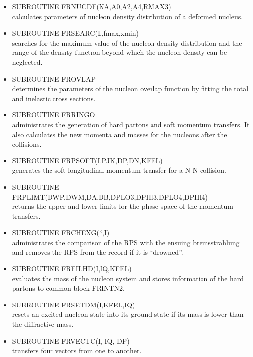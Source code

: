 \begin{itemize}
\item  SUBROUTINE FRNUCDF(NA,A0,A2,A4,RMAX3) \\
 calculates parameters of nucleon density distribution of a deformed nucleus.

\item  SUBROUTINE FRSEARC(L,fmax,xmin) \\
 searches for the maximum value of the nucleon density distribution
 and the range of the density function beyond which the 
 nucleon density can be neglected.

\item  SUBROUTINE FROVLAP \\
 determines the parameters of the nucleon overlap function by fitting
 the total and inelastic cross sections.

\item  SUBROUTINE FRRINGO \\
 administrates the generation of hard partons and soft momentum
 transfers.  It also calculates the new momenta and masses for the 
 nucleons after the collisions.  

\item  SUBROUTINE FRPSOFT(I,PJK,DP,DN,KFEL) \\
 generates the soft longitudinal momentum transfer for a N-N collision.

\item  SUBROUTINE FRPLIMT(DWP,DWM,DA,DB,DPLO3,DPHI3,DPLO4,DPHI4) \\
 returns the upper and lower limits for the phase space of the 
 momentum transfers.

\item SUBROUTINE FRCHEXG(*,I) \\
 administrates the comparison of the RPS with the ensuing bremsstrahlung
 and removes the RPS from the record if it is ``drowned''. 

\item  SUBROUTINE FRFILHD(I,IQ,KFEL) \\
 evaluates the mass of the nucleon system and stores information of the
 hard partons to common block FRINTN2.

\item  SUBROUTINE FRSETDM(I,KFEL,IQ) \\
 resets an excited nucleon state into its ground state if its mass is lower
 than the diffractive mass.
 
\item  SUBROUTINE FRVECTC(I, IQ, DP) \\
 transfers four vectors from one to another.


\end{itemize}
